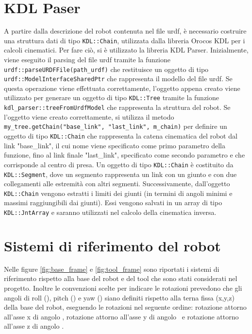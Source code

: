 \section{KDL Paser} \label{cap_kdlparser}
A partire dalla descrizione del robot contenuta nel file urdf, è necessario costruire una struttura dati di tipo \texttt{KDL::Chain}, utilizzata dalla libreria Orocos KDL per i calcoli cinematici. Per fare ciò, si è utilizzato la libreria KDL Parser. Inizialmente, viene eseguito il parsing del file urdf tramite la funzione \texttt{urdf::parseURDFFile(path\_urdf)} che restituisce un oggetto di tipo \texttt{urdf::ModelInterfaceSharedPtr} che rappresenta il modello del file urdf. Se questa operazione viene effettuata correttamente, l'oggetto appena creato viene utilizzato per generare un oggetto di tipo \texttt{KDL::Tree} tramite la funzione \texttt{kdl\_parser::treeFromUrdfModel} che rappresenta la struttura del robot. Se l'oggetto viene creato correttamente, si utilizza il metodo \texttt{my\_tree.getChain("base\_link", "last\_link", m\_chain)} per definire un oggetto di tipo \texttt{KDL::Chain} che rappresenta la catena cinematica del robot dal link "base\_link", il cui nome viene specificato come primo parametro della funzione, fino al link finale "last\_link", specificato come secondo parametro e che corrisponde al centro di presa. Un oggetto di tipo \texttt{KDL::Chain} è costituito da \texttt{KDL::Segment}, dove un segmento rappresenta un link con un giunto e con due collegamenti alle estremità con altri segmenti. 
Successivamente, dall'oggetto \texttt{KDL::Chain} vengono estratti i limiti dei giunti (in termini di angoli minimi e massimi raggiungibili dai giunti). Essi vengono salvati in un array di tipo \texttt{KDL::JntArray} e saranno utilizzati nel calcolo della cinematica inversa.

\section{Sistemi di riferimento del robot}
Nelle figure \ref{fig:base_frame} e \ref{fig:tool_frame} sono riportati i sistemi di riferimento rispetto alla base del robot e del tool che sono stati considerati nel progetto. Inoltre le convenzioni scelte per indicare le rotazioni prevedono che gli angoli di roll (\textalpha), pitch (\textbeta) e yaw (\textgamma) siano definiti rispetto alla terna fissa (x,y,z) della base del robot, eseguendo le rotazioni nel seguente ordine: rotazione attorno all'asse x di angolo \textalpha, rotazione attorno all'asse y di angolo \textbeta\ e rotazione attorno all'asse z di angolo \textgamma.

